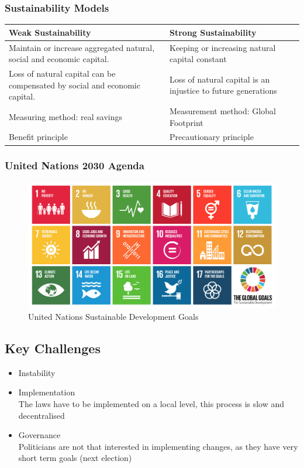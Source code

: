\documentclass[11pt]{article}
\theoremstyle{definition}
\begin{document}
\subsubsection{Sustainability Models}
\begin{tabularx}{\linewidth}{|X|X|}
	\hline
	\textbf{Weak Sustainability} & \textbf{Strong Sustainability}\\
	\hline
	Maintain or increase aggregated natural, social and economic capital. & Keeping or increasing natural capital constant \\
	\hline
	Loss of natural capital can be compensated by social and economic capital. & Loss of natural capital is an injustice to future generations \\
	\hline
	Measuring method: real savings & Measurement method: Global Footprint \\
	\hline
	Benefit principle & Precautionary principle \\
	\hline
\end{tabularx}

\subsubsection{United Nations 2030 Agenda}
\begin{figure}[H]
	\centering
	\includegraphics[width=0.9\linewidth]{img/sustainable_development_goals}
	\caption{United Nations Sustainable Development Goals}
	\label{fig:sustainabledevelopmentgoals}
\end{figure}

\subsection{Key Challenges}
\begin{itemize}
	\item Instability
	\item Implementation\\The laws have to be implemented on a local level, this process is slow and decentralised
	\item Governance\\Politicians are not that interested in implementing changes, as they have very short term goals (next election)
\end{itemize}
\end{document}
